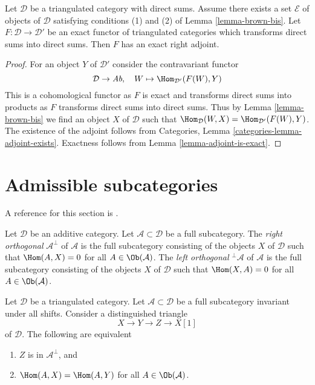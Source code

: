 \begin{proposition}
\label{proposition-brown-bis}
Let $\mathcal{D}$ be a triangulated category with direct sums.
Assume there exists a set $\mathcal{E}$ of objects of $\mathcal{D}$
satisfying conditions (1) and (2) of Lemma \ref{lemma-brown-bis}.
Let $F : \mathcal{D} \to \mathcal{D}'$ be an exact functor of triangulated
categories which transforms direct sums into direct sums.
Then $F$ has an exact right adjoint.
\end{proposition}

\begin{proof}
For an object $Y$ of $\mathcal{D}'$ consider the contravariant functor
$$
\mathcal{D} \to \textit{Ab},\quad W \mapsto \Hom_{\mathcal{D}'}(F(W), Y)
$$
This is a cohomological functor as $F$ is exact and transforms direct sums
into products as $F$ transforms direct sums into direct sums. Thus by
Lemma \ref{lemma-brown-bis} we find an object $X$ of $\mathcal{D}$ such that
$\Hom_\mathcal{D}(W, X) = \Hom_{\mathcal{D}'}(F(W), Y)$.
The existence of the adjoint follows from
Categories, Lemma \ref{categories-lemma-adjoint-exists}.
Exactness follows from Lemma \ref{lemma-adjoint-is-exact}.
\end{proof}









\section{Admissible subcategories}
\label{section-admissible}

\noindent
A reference for this section is \cite[Section 1]{Bondal-Kapranov}.

\begin{definition}
\label{definition-orthogonal}
Let $\mathcal{D}$ be an additive category. Let $\mathcal{A} \subset \mathcal{D}$
be a full subcategory. The {\it right orthogonal} $\mathcal{A}^\perp$ of
$\mathcal{A}$ is the full subcategory consisting of the objects $X$ of
$\mathcal{D}$ such that $\Hom(A, X) = 0$ for all $A \in \Ob(\mathcal{A})$.
The {\it left orthogonal} ${}^\perp\mathcal{A}$ of
$\mathcal{A}$ is the full subcategory consisting of the objects $X$ of
$\mathcal{D}$ such that $\Hom(X, A) = 0$ for all $A \in \Ob(\mathcal{A})$.
\end{definition}

\begin{lemma}
\label{lemma-pre-prepare-adjoint}
Let $\mathcal{D}$ be a triangulated category.
Let $\mathcal{A} \subset \mathcal{D}$
be a full subcategory invariant under all shifts.
Consider a distinguished triangle
$$
X \to Y \to Z \to X[1]
$$
of $\mathcal{D}$. The following are equivalent
\begin{enumerate}
\item $Z$ is in $\mathcal{A}^\perp$, and
\item $\Hom(A, X) = \Hom(A, Y)$ for all $A \in \Ob(\mathcal{A})$.
\end{enumerate}
\end{lemma}

